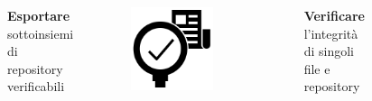 \documentclass{beamer}
\begin{document}
\begin{frame}
\begin{columns}
\begin{figure}
		\end{figure}
		\textbf{Esportare} sottoinsiemi
		di repository verificabili
		\centering
		\begin{figure}
			\includegraphics[width=0.7\textwidth]{figures/verify.png}
		\end{figure}
		\textbf{Verificare} l'integrità
		di singoli file e repository
	\end{columns}
\end{frame}
\end{document}
